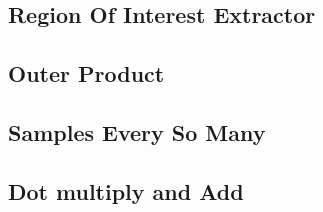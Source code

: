 \documentclass[11pt]{article}
\begin{document}
\subsection{Region Of Interest Extractor}

\subsection{Outer Product}

\subsection{Samples Every So Many}

\subsection{Dot multiply and Add}
\end{document}
